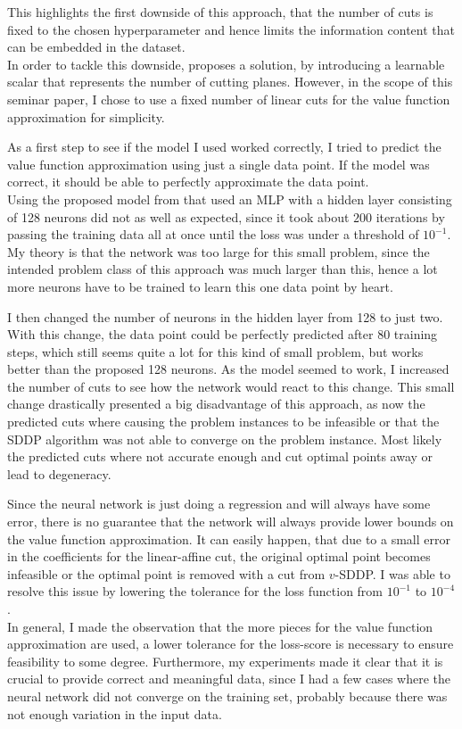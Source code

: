 This highlights the first downside of this approach, that the number of cuts is fixed to the chosen hyperparameter and hence limits the information content that can be embedded in the dataset. \\
In order to tackle this downside, \cite{NSDDP} proposes a solution, by introducing a learnable scalar that represents the number of cutting planes.
However, in the scope of this seminar paper, I chose to use a fixed number of linear cuts for the value function approximation for simplicity.

As a first step to see if the model I used worked correctly, I tried to predict the value function approximation using just a single data point.
If the model was correct, it should be able to perfectly approximate the data point. \\
Using the proposed model from \cite{NSDDP} that used an MLP with a hidden layer consisting of 128 neurons did not as well as expected, since it took about $200$ iterations by passing the training data all at once until the loss was under a threshold of $10^{-1}$. \\
My theory is that the network was too large for this small problem, since the intended problem class of this approach was much larger than this, hence a lot more neurons have to be trained to learn this one data point by heart.

I then changed the number of neurons in the hidden layer from 128 to just two. With this change, the data point could be perfectly predicted after $80$ training steps, which still seems quite a lot for this kind of small problem, but works better than the proposed 128 neurons.
As the model seemed to work, I increased the number of cuts to see how the network would react to this change.
This small change drastically presented a big disadvantage of this approach, as now the predicted cuts where causing the problem instances to be infeasible or that the SDDP algorithm was not able to converge on the problem instance.
Most likely the predicted cuts where not accurate enough and cut optimal points away or lead to degeneracy.

Since the neural network is just doing a regression and will always have some error, there is no guarantee that the network will always provide lower bounds on the value function approximation.
It can easily happen, that due to a small error in the coefficients for the linear-affine cut, the original optimal point becomes infeasible or the optimal point is removed with a cut from $v$-SDDP. 
I was able to resolve this issue by lowering the tolerance for the loss function from $10^{-1}$ to $10^{-4}$. \\
In general, I made the observation that the more pieces for the value function approximation are used, a lower tolerance for the loss-score is necessary to ensure feasibility to some degree.
Furthermore, my experiments made it clear that it is crucial to provide correct and meaningful data, since I had a few cases where the neural network did not converge on the training set, probably because there was not enough variation in the input data.

